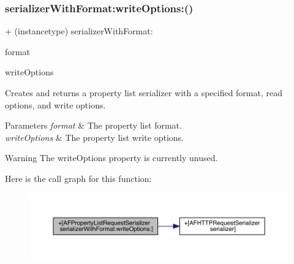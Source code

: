 \subsubsection{\texorpdfstring{serializer\+With\+Format\+:write\+Options\+:()}{serializerWithFormat:writeOptions:()}\hspace{0.1cm}{\footnotesize\ttfamily [1/3]}}
{\footnotesize\ttfamily + (instancetype) serializer\+With\+Format\+: \begin{DoxyParamCaption}\item[{(N\+S\+Property\+List\+Format)}]{format }\item[{writeOptions:(N\+S\+Property\+List\+Write\+Options)}]{write\+Options }\end{DoxyParamCaption}}

Creates and returns a property list serializer with a specified format, read options, and write options.


\begin{DoxyParams}{Parameters}
{\em format} & The property list format. \\
\hline
{\em write\+Options} & The property list write options.\\
\hline
\end{DoxyParams}
\begin{DoxyWarning}{Warning}
The {\ttfamily write\+Options} property is currently unused. 
\end{DoxyWarning}
Here is the call graph for this function\+:\nopagebreak
\begin{figure}[H]
\begin{center}
\leavevmode
\includegraphics[width=350pt]{interface_a_f_property_list_request_serializer_aa8620db96210cdd972538da3b5954c85_cgraph}
\end{center}
\end{figure}
\mbox{\label{interface_a_f_property_list_request_serializer_aa8620db96210cdd972538da3b5954c85}} 
